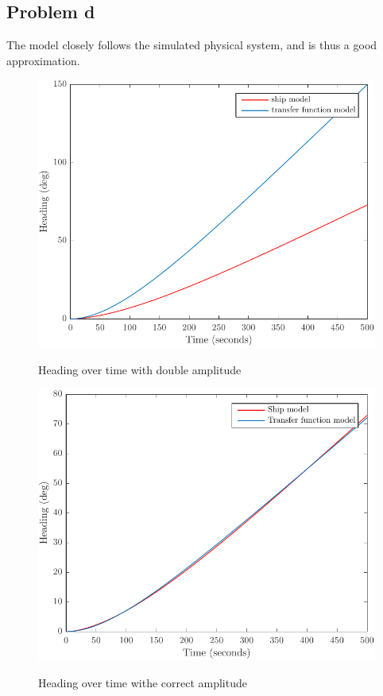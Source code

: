 \subsection{Problem d}
The model closely follows the simulated physical system, and is thus a good approximation.

\begin{figure}[ht]
    \centering
    \begin{minipage}[b]{0.48\textwidth}
        \includegraphics[width=\textwidth]{"images/1d-dobbel_amplitude"}
        \label{fig:1d-dobbel_amplitude}
        \caption{Heading over time with double amplitude}
    \end{minipage}
    \hfill
    \begin{minipage}[b]{0.48\textwidth}
        \includegraphics[width=\textwidth]{"images/1d-riktig_amplitude"}
        \label{fig:1d-riktig_amplitude}
        \caption{Heading over time withe correct amplitude}
    \end{minipage}
\end{figure}